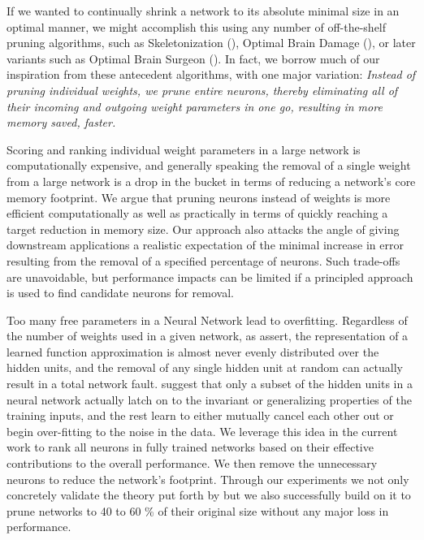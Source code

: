 If we wanted to continually shrink a network to its absolute minimal size in an optimal manner, we might accomplish this using any number of off-the-shelf pruning algorithms, such as Skeletonization (\cite{mozer1989skeletonization}), Optimal Brain Damage (\cite{lecun1989optimal}), or later variants such as Optimal Brain Surgeon (\cite{hassibi1993second}). In fact, we borrow much of our inspiration from these antecedent algorithms, with one major variation:\textit{ Instead of pruning individual weights, we prune entire neurons, thereby eliminating all of their incoming and outgoing weight parameters in one go, resulting in more memory saved, faster.}

Scoring and ranking individual weight parameters in a large network is computationally expensive, and generally speaking the removal of a single weight from a large network is a drop in the bucket in terms of reducing a network's core memory footprint.  We argue that pruning neurons instead of weights is more efficient computationally as well as practically in terms of quickly reaching a target reduction in memory size. Our approach also attacks the angle of giving downstream applications a realistic expectation of the minimal increase in error resulting from the removal of a specified percentage of neurons. Such trade-offs are unavoidable, but performance impacts can be limited if a principled approach is used to find candidate neurons for removal. 

Too many free parameters in a Neural Network lead to overfitting. Regardless of the number of weights used in a given network, as \cite{segee1991fault} assert, the representation of a learned function approximation is almost never evenly distributed over the hidden units, and the removal of any single hidden unit at random can actually result in a total network fault. \cite{mozer1989using} suggest that only a subset of the hidden units in a neural network actually latch on to the invariant or generalizing properties of the training inputs, and the rest learn to either mutually cancel each other out or begin over-fitting to the noise in the data. We leverage this idea in the current work to rank all neurons in fully trained networks based on their effective contributions to the overall performance. We then remove the unnecessary neurons to reduce the network's footprint. Through our experiments we not only concretely validate the theory put forth by \cite{mozer1989using} but we also successfully build on  it to prune networks to 40 to 60 \% of their original size without any major loss in performance.
